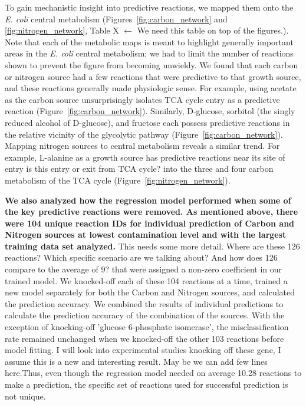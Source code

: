 \documentclass[12pt]{article}
\begin{document}
To gain mechanistic insight into predictive reactions, we mapped them onto the \emph{E. coli} central metabolism (Figures~\ref{fig:carbon_network} and \ref{fig:nitrogen_network}, Table X {\color{red}$\leftarrow$ We need this table on top of the figures.}). Note that each of the metabolic maps is meant to highlight generally important areas in the \emph{E. coli} central metabolism; we had to limit the number of reactions shown to prevent the figure from becoming unwieldy. We found that each carbon or nitrogen source had a few reactions that were predictive to that growth source, and these reactions generally made physiologic sense. For example, using acetate as the carbon source unsurprisingly isolates TCA cycle entry as a predictive reaction (Figure~\ref{fig:carbon_network}). Similarly, D-glucose, sorbitol (the singly reduced alcohol of D-glucose), and fructose each possess predictive reactions in the relative vicinity of the glycolytic pathway (Figure~\ref{fig:carbon_network}). Mapping nitrogen sources to central metabolism reveals a similar trend. For example, L-alanine as a growth source has predictive reactions near its site of entry {\color{red}is this entry or exit from TCA cycle?} into the three and four carbon metabolism of the TCA cycle (Figure~\ref{fig:nitrogen_network}).

\textbf{We also analyzed how the regression model performed when some of the key predictive reactions were removed. As mentioned above, there were 104 unique reaction IDs for individual prediction of Carbon and Nitrogen sources at lowest contamination level and with the largest training data set analyzed.} {\color{red}This needs some more detail. Where are these 126 reactions? Which specific scenario are we talking about? And how does 126 compare to the average of 9?} that were assigned a non-zero coefficient in our trained model. We knocked-off each of these 104 reactions at a time, trained a new model separately for both the Carbon and Nitrogen sources, and calculated the prediction accuracy. We combined the results of individual predictions to calculate the prediction accuracy of the combination of the sources. With the exception of knocking-off 'glucose 6-phosphate isomerase', the misclassification rate remained unchanged when we knocked-off the other 103 reactions before model fitting. {\color{red} I will look into experimental studies knocking off these gene, I assume this is a new and interesting result. May be we can add few lines here.}Thus, even though the regression model needed on average 10.28 reactions to make a prediction, the specific set of reactions used for successful prediction is not unique.
\end{document}
